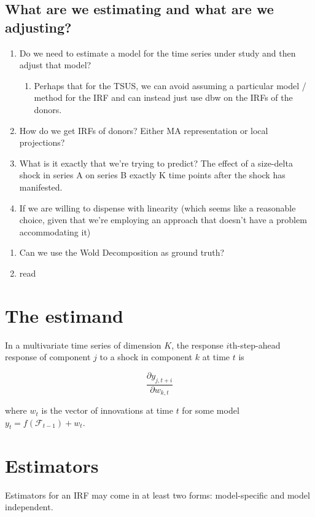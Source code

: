 \documentclass[11pt]{article}
\theoremstyle{definition}
\begin{document}
\subsection{What are we estimating and what are we adjusting?}
\begin{enumerate}
  \item Do we need to estimate a model for the time series under study and then adjust that model?
  \begin{enumerate}
  \item Perhaps that for the TSUS, we can avoid assuming a particular model / method for the IRF and can instead just use dbw on the IRFs of the donors. 
  \end{enumerate}
  \item How do we get IRFs of donors? Either MA representation or local projections?
  \item What is it exactly that we're trying to predict?  The effect of a size-delta shock in series A on series B exactly K time points after the shock has manifested.
  \item If we are willing to dispense with linearity (which seems like a reasonable choice, given that we're employing an approach that doesn't have a problem accommodating it)
\end{enumerate}

\begin{enumerate}
    \item Can we use the Wold Decomposition as ground truth?
    \item read \citet{ho2023averaging}
\end{enumerate}

\section{The estimand}

In a multivariate time series of dimension $K$, the response $i$th-step-ahead response of component $j$ to a shock in component $k$ at time $t$ is

\[
   \frac{\partial y_{j,t+i}}{\partial w_{k,t}}
\]

where $w_{t}$ is the vector of innovations at time $t$ for some model $y_{t} = f(\mathcal{F}_{t-1}) + w_{t}$.

\section{Estimators}

Estimators for an IRF may come in at least two forms: model-specific and model independent.
\end{document}
